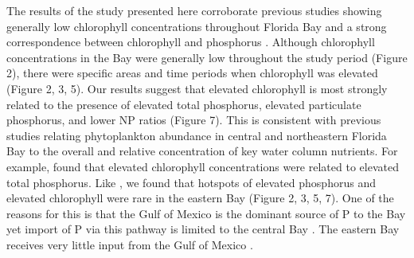 The results of the study presented here corroborate previous studies showing generally low chlorophyll concentrations throughout Florida Bay and a strong correspondence between chlorophyll and phosphorus \citep{fourqurean1993process, phlips_spatial_1996}. Although chlorophyll concentrations in the Bay were generally low throughout the study period (Figure 2), there were specific areas and time periods when chlorophyll was elevated (Figure 2, 3, 5). Our results suggest that elevated chlorophyll is most strongly related to the presence of elevated total phosphorus, elevated particulate phosphorus, and lower NP ratios (Figure 7). This is consistent with previous studies relating phytoplankton abundance in central and northeastern Florida Bay to the overall and relative concentration of key water column nutrients. For example, \citet{fourqurean1993process} found that elevated chlorophyll concentrations were related to elevated total phosphorus. Like \citet{fourqurean1993process}, we found that hotspots of elevated phosphorus and elevated chlorophyll were rare in the eastern Bay (Figure 2, 3, 5, 7). One of the reasons for this is that the Gulf of Mexico is the dominant source of P to the Bay yet import of P via this pathway is limited to the central Bay \citep{childers_relating_2006, rudnick1999phosphorus}. The eastern Bay receives very little input from the Gulf of Mexico \citep{lee2016circulation}. 


